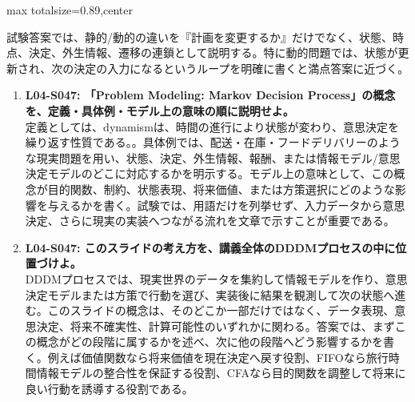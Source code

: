 \begin{minipage}[t]{0.58\textwidth}
\begin{adjustbox}{max totalsize={\textwidth}{0.89\textheight},center}
\begin{minipage}{\textwidth}
試験答案では、静的/動的の違いを『計画を変更するか』だけでなく、状態、時点、決定、外生情報、遷移の連鎖として説明する。特に動的問題では、状態が更新され、次の決定の入力になるというループを明確に書くと満点答案に近づく。\par{}\begin{enumerate}\item \textbf{L04-S047: 「Problem Modeling: Markov Decision Process」の概念を、定義・具体例・モデル上の意味の順に説明せよ。}\\定義としては、dynamismは、時間の進行により状態が変わり、意思決定を繰り返す性質である。。具体例では、配送・在庫・フードデリバリーのような現実問題を用い、状態、決定、外生情報、報酬、または情報モデル/意思決定モデルのどこに対応するかを明示する。モデル上の意味として、この概念が目的関数、制約、状態表現、将来価値、または方策選択にどのような影響を与えるかを書く。試験では、用語だけを列挙せず、入力データから意思決定、さらに現実の実装へつながる流れを文章で示すことが重要である。\item \textbf{L04-S047: このスライドの考え方を、講義全体のDDDMプロセスの中に位置づけよ。}\\DDDMプロセスでは、現実世界のデータを集約して情報モデルを作り、意思決定モデルまたは方策で行動を選び、実装後に結果を観測して次の状態へ進む。このスライドの概念は、そのどこか一部だけではなく、データ表現、意思決定、将来不確実性、計算可能性のいずれかに関わる。答案では、まずこの概念がどの段階に属するかを述べ、次に他の段階へどう影響するかを書く。例えば価値関数なら将来価値を現在決定へ戻す役割、FIFOなら旅行時間情報モデルの整合性を保証する役割、CFAなら目的関数を調整して将来に良い行動を誘導する役割である。\end{enumerate}
\end{minipage}
\end{adjustbox}
\end{minipage}


